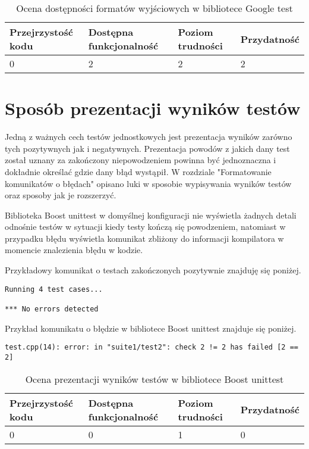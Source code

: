 \documentclass[12pt,a4paper,notitlepage]{report}
\begin{document}
\begin{center}
			\begin{table}[!ht]
			\caption{Ocena dostępności formatów wyjściowych w bibliotece Google test}
			\label{}
			\begin{tabular}[!hc]{|l|l|l|l|}
		\hline
		Przejrzystość kodu 	&	Dostępna funkcjonalność	&	Poziom trudności	&	Przydatność \\ \hline
		0					&	2						&	2					& 	2  			\\ \hline
			\end{tabular}
			\end{table} 
		\end{center}


\section{Sposób prezentacji wyników testów}

Jedną z ważnych cech testów jednostkowych jest prezentacja wyników zarówno tych pozytywnych jak i negatywnych. Prezentacja powodów z jakich dany test został uznany za zakończony niepowodzeniem powinna być jednoznaczna i dokładnie określać gdzie dany błąd wystąpił.
W rozdziale "Formatowanie komunikatów o błędach" opisano luki w sposobie wypisywania wyników testów oraz sposoby jak je rozszerzyć.

Biblioteka Boost unittest w domyślnej konfiguracji nie wyświetla żadnych detali odnośnie testów w sytuacji kiedy testy kończą się powodzeniem, natomiast w przypadku błędu wyświetla komunikat zbliżony do informacji kompilatora w momencie znalezienia błędu w kodzie.

Przykładowy komunikat o testach zakończonych pozytywnie znajduję się poniżej.
\begin{lstlisting}[label=some-code,caption=Przykłądowy pozytywny wynik testu w bibliotece Boost unittest]
Running 4 test cases...

*** No errors detected
		\end{lstlisting}

Przykład komunikatu o błędzie w bibliotece Boost unittest znajduje się poniżej.
\begin{lstlisting}[label=some-code,caption=Przykłądowy negatywny wynik testu w bibliotece Boost unittest]
test.cpp(14): error: in "suite1/test2": check 2 != 2 has failed [2 == 2]
		\end{lstlisting}


\begin{center}
			\begin{table}[!ht]
			\caption{Ocena prezentacji wyników testów w bibliotece Boost unittest}
			\label{}
			\begin{tabular}[!hc]{|l|l|l|l|}
		\hline
		Przejrzystość kodu 	&	Dostępna funkcjonalność	&	Poziom trudności	&	Przydatność \\ \hline
		0					&	0						&	1					& 	0  			\\ \hline
			\end{tabular}
			\end{table} 
		\end{center}
\end{document}
